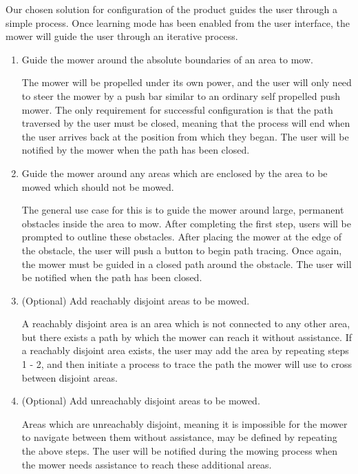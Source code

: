 \documentclass[11pt,letterpaper]{article}
\begin{document}
Our chosen solution for configuration of the product guides the user through a
simple process.  Once learning mode has been enabled from the user
interface, the mower will guide the user through an iterative process.
\begin{enumerate}
  \item Guide the mower around the absolute boundaries of an area to mow.
  
  		The mower will be propelled under its own power, and the user will only need
  		to steer the mower by a push bar similar to an ordinary self propelled push
  		mower.  The only requirement for successful configuration is that the path
  		traversed by the user must be closed, meaning that the process will end when
  		the user arrives back at the position from which they began.  The user will
  		be notified by the mower when the path has been closed.
  		
  \item Guide the mower around any areas which are enclosed by the area to be
  mowed which should not be mowed.
  
  		The general use case for this is to guide the mower around large, permanent
  		obstacles inside the area to mow.  After completing the first step, users
  		will be prompted to outline these obstacles.  After placing the mower at the
  		edge of the obstacle, the user will push a button to begin path tracing. 
  		Once again, the mower must be guided in a closed path around the obstacle. 
  		The user will be notified when the path has been closed.
  
  \item (Optional) Add reachably disjoint areas to be mowed.
  
        A reachably disjoint area is an area which is not connected to any other area,
        but there exists a path by which the mower can reach it without
        assistance.  If a reachably disjoint area exists, the user
        may add the area by repeating steps 1 - 2, and then initiate a process to trace the path the mower
        will use to cross between disjoint areas.
        
  \item (Optional) Add unreachably disjoint areas to be mowed.
  
        Areas which are unreachably disjoint, meaning it is impossible for the
        mower to navigate between them without assistance, may be defined by
        repeating the above steps. The user will be notified during the mowing
        process when the mower needs assistance to reach these additional areas.
\end{enumerate}
\end{document}
